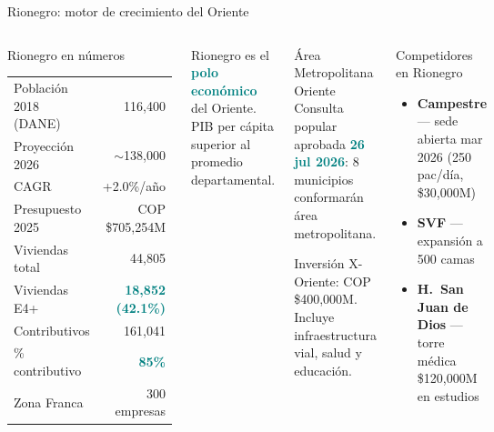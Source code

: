 \documentclass[aspectratio=169, 11pt]{beamer}
\newcommand{\highlight}[1]{\textcolor{teal}{\textbf{#1}}}
\newcommand{\src}[1]{\par\vspace{2pt}{\tiny\textcolor{slate}{Fuente: #1}}}
\begin{document}
\begin{frame}{Rionegro: motor de crecimiento del Oriente}
\begin{columns}[T]
\begin{block}{\small Rionegro en números}
\scriptsize
\begin{tabular}{@{}lr@{}}
\toprule
Población 2018 (DANE) & 116,400 \\
Proyección 2026 & $\sim$138,000 \\
CAGR & +2.0\%/año \\
Presupuesto 2025 & COP \$705,254M \\
Viviendas total & 44,805 \\
Viviendas E4+ & \highlight{18,852 (42.1\%)} \\
Contributivos & 161,041 \\
\% contributivo & \highlight{85\%} \\
Zona Franca & 300 empresas \\
\bottomrule
\end{tabular}
\end{block}

\vspace{3pt}
{\scriptsize Rionegro es el \highlight{polo económico} del Oriente. PIB per cápita superior al promedio departamental.}

\begin{exampleblock}{\small Área Metropolitana Oriente}
\footnotesize
Consulta popular aprobada \highlight{26 jul 2026}: 8 municipios conformarán área metropolitana.

\vspace{3pt}
Inversión X-Oriente: COP \$400,000M. Incluye infraestructura vial, salud y educación.
\end{exampleblock}

\vspace{4pt}
\begin{alertblock}{\small Competidores en Rionegro}
\scriptsize
\begin{itemize}\setlength{\itemsep}{1pt}
  \item \textbf{Campestre} --- sede abierta mar 2026 (250 pac/día, \$30,000M)
  \item \textbf{SVF} --- expansión a 500 camas
  \item \textbf{H.\ San Juan de Dios} --- torre médica \$120,000M en estudios
\end{itemize}
\end{alertblock}
\end{columns}
\src{DANE, DiariOriente, Decreto 096/2021, REPS}
\end{frame}
\end{document}
